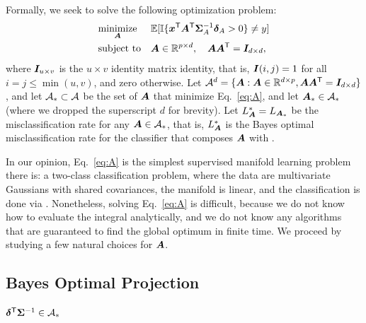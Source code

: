 \documentclass[10pt]{article}
\begin{document}
Formally, we seek to solve the following optimization problem:
\begin{equation} \label{eq:A}
\begin{aligned}
& \underset{\boldsymbol{A}}{\text{minimize}}
& & \mathbb{E} [ \mathbb{I} \{ \boldsymbol{x}^{\mathsf{T}} \boldsymbol{A}^{\mathsf{T}} \boldsymbol{\Sigma}^{-1}_A \boldsymbol{\delta}_A > 0\} \neq y] \\
& \text{subject to} & & \boldsymbol{A} \in \mathbb{R}^{p \times d}, \quad \boldsymbol{A} \boldsymbol{A}^{\mathsf{T}} = \boldsymbol{I}_{d \times d},
\end{aligned}
\end{equation}
where $\boldsymbol{I}_{u \times v}$ is the $u \times v$ identity matrix identity, that is, $\boldsymbol{I}(i,j)=1$ for all $i=j \leq \min(u,v)$, and zero otherwise.
Let $\mathcal{A}^d=\{\boldsymbol{A} : \boldsymbol{A} \in \mathbb{R}^{d \times p}, \boldsymbol{A} \boldsymbol{A}^{\mathsf{T}} = \boldsymbol{I}_{d \times d}\}$, and let $\mathcal{A}_* \subset \mathcal{A}$ be the set of $\boldsymbol{A}$  that minimize Eq.~\eqref{eq:A}, and let $\boldsymbol{A}_* \in \mathcal{A}_*$ (where we dropped the superscript $d$ for brevity).   Let $L_{\boldsymbol{A}}^*=L_{\boldsymbol{A}_*}$ be the misclassification rate for any $\boldsymbol{A} \in \mathcal{A}_*$, that is, $L_{\boldsymbol{A}}^*$ is the Bayes optimal misclassification rate for the classifier that composes $\boldsymbol{A}$ with \Lda.


In our opinion, Eq.~\eqref{eq:A} is the simplest supervised manifold learning problem there is: a two-class classification problem, where the data are multivariate Gaussians with shared covariances, the manifold is linear, and the classification is done via \Lda.
Nonetheless, solving Eq.~\eqref{eq:A} is difficult, because we do not know how to evaluate the integral analytically, and we do not know any algorithms that are guaranteed to find the global optimum in finite time.  
We proceed by studying a few natural choices for $\boldsymbol{A}$.





\subsection{Bayes Optimal Projection}

\begin{lem}
$\boldsymbol{\delta}^{\mathsf{T}}  \boldsymbol{\Sigma}^{-1} \in \mathcal{A}_*$
\end{lem}
\end{document}
